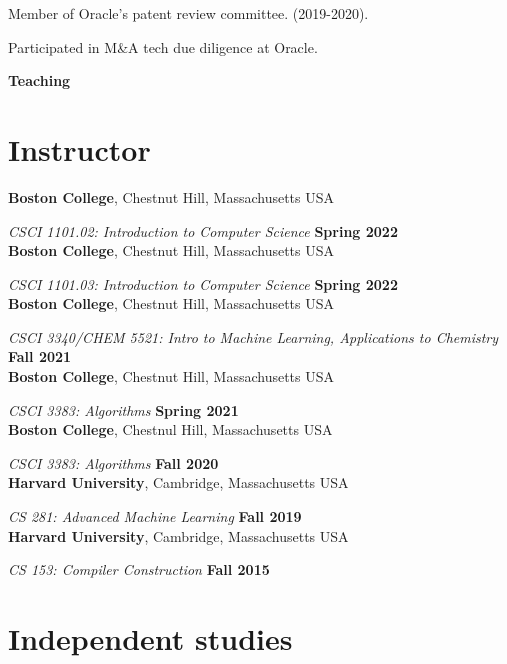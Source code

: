 \documentclass[margin,line]{res}
\begin{document}
\begin{resume}
Member of Oracle's patent review committee. (2019-2020).

Participated in M\&A tech due diligence at Oracle.

\newpage
  {\bf {\Large Teaching}}

\section{\sc Instructor}

{\bf Boston College}, Chestnut Hill, Massachusetts USA
\vspace{-.4cm}

{\em CSCI 1101.02: Introduction  to Computer Science} \hfill {\bf Spring 2022}\\
{\bf Boston College}, Chestnut Hill, Massachusetts USA
\vspace{-.4cm}

{\em CSCI 1101.03: Introduction  to Computer Science} \hfill {\bf Spring 2022}\\
{\bf Boston College}, Chestnut Hill, Massachusetts USA
\vspace{-.4cm}

{\em CSCI 3340/CHEM 5521: Intro to Machine Learning, Applications to Chemistry} \hfill {\bf Fall 2021}\\
{\bf Boston College}, Chestnut Hill, Massachusetts USA
\vspace{-.4cm}

{\em CSCI 3383: Algorithms} \hfill {\bf Spring 2021}\\
{\bf Boston College}, Chestnul Hill, Massachusetts USA
\vspace{-.4cm}

{\em CSCI 3383: Algorithms} \hfill {\bf Fall 2020}\\
{\bf Harvard University}, Cambridge, Massachusetts USA
\vspace{-.4cm}

{\em CS 281: Advanced Machine Learning} \hfill {\bf Fall 2019}\\
{\bf Harvard University}, Cambridge, Massachusetts USA
\vspace{-.4cm}

{\em CS 153: Compiler Construction} \hfill {\bf Fall 2015}\\


\section{\sc Independent studies}


\end{resume}
\end{document}
